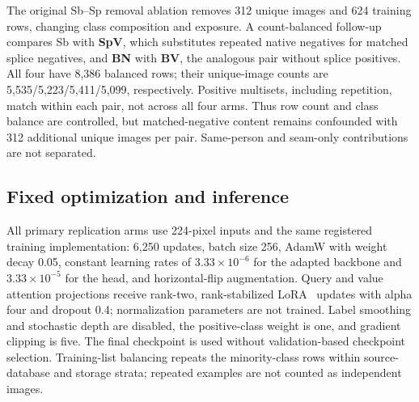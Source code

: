 The original Sb--Sp removal ablation removes 312 unique images and 624 training rows, changing class composition and exposure. A count-balanced follow-up compares Sb with \textbf{SpV}, which substitutes repeated native negatives for matched splice negatives, and \textbf{BN} with \textbf{BV}, the analogous pair without splice positives. All four have 8,386 balanced rows; their unique-image counts are 5,535/5,223/5,411/5,099, respectively. Positive multisets, including repetition, match within each pair, not across all four arms. Thus row count and class balance are controlled, but matched-negative content remains confounded with 312 additional unique images per pair. Same-person and seam-only contributions are not separated.

\subsection{Fixed optimization and inference}
All primary replication arms use 224-pixel inputs and the same registered training implementation: 6,250 updates, batch size 256, AdamW with weight decay 0.05, constant learning rates of $3.33\times10^{-6}$ for the adapted backbone and $3.33\times10^{-5}$ for the head, and horizontal-flip augmentation. Query and value attention projections receive rank-two, rank-stabilized LoRA~\cite{kalajdzievski2023rslora} updates with alpha four and dropout 0.4; normalization parameters are not trained. Label smoothing and stochastic depth are disabled, the positive-class weight is one, and gradient clipping is five. The final checkpoint is used without validation-based checkpoint selection. Training-list balancing repeats the minority-class rows within source-database and storage strata; repeated examples are not counted as independent images.

